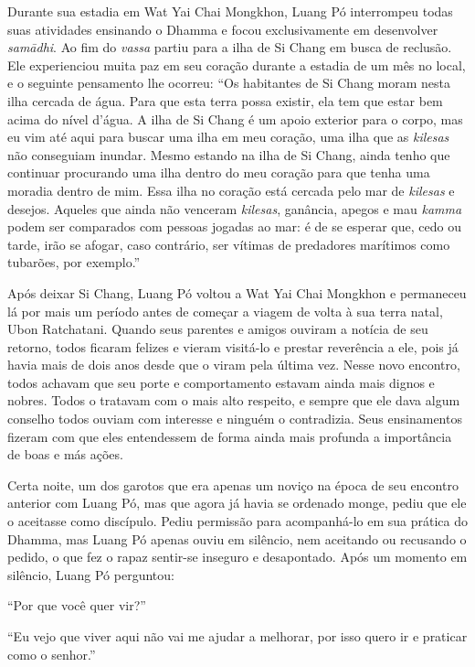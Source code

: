 Durante sua estadia em Wat Yai Chai Mongkhon, Luang Pó interrompeu todas
suas atividades ensinando o Dhamma e focou exclusivamente em desenvolver
\emph{samādhi}. Ao fim do \emph{vassa} partiu para a ilha de Si Chang em
busca de reclusão. Ele experienciou muita paz em seu coração durante a
estadia de um mês no local, e o seguinte pensamento lhe ocorreu: ``Os
habitantes de Si Chang moram nesta ilha cercada de água. Para que esta
terra possa existir, ela tem que estar bem acima do nível d'água. A ilha
de Si Chang é um apoio exterior para o corpo, mas eu vim até aqui para
buscar uma ilha em meu coração, uma ilha que as \emph{kilesas} não
conseguiam inundar. Mesmo estando na ilha de Si Chang, ainda tenho que
continuar procurando uma ilha dentro do meu coração para que tenha uma
moradia dentro de mim. Essa ilha no coração está cercada pelo mar de
\emph{kilesas} e desejos. Aqueles que ainda não venceram \emph{kilesas},
ganância, apegos e mau \emph{kamma} podem ser comparados com
pessoas jogadas ao mar: é de se esperar que, cedo ou tarde, irão se
afogar, caso contrário, ser vítimas de predadores marítimos como
tubarões, por exemplo.''

Após deixar Si Chang, Luang Pó voltou a Wat Yai Chai Mongkhon e
permaneceu lá por mais um período antes de começar a viagem de volta à
sua terra natal, Ubon Ratchatani. Quando seus parentes e amigos ouviram
a notícia de seu retorno, todos ficaram felizes e vieram visitá-lo e
prestar reverência a ele, pois já havia mais de dois anos desde que o
viram pela última vez. Nesse novo encontro, todos achavam que seu porte
e comportamento estavam ainda mais dignos e nobres. Todos o tratavam com
o mais alto respeito, e sempre que ele dava algum conselho todos ouviam
com interesse e ninguém o contradizia. Seus ensinamentos fizeram com que
eles entendessem de forma ainda mais profunda a importância de boas e
más ações.

Certa noite, um dos garotos que era apenas um noviço na época de seu
encontro anterior com Luang Pó, mas que agora já havia se ordenado
monge, pediu que ele o aceitasse como discípulo. Pediu permissão para
acompanhá-lo em sua prática do Dhamma, mas Luang Pó apenas ouviu em
silêncio, nem aceitando ou recusando o pedido, o que fez o rapaz
sentir-se inseguro e desapontado. Após um momento em silêncio, Luang Pó
perguntou:

``Por que você quer vir?''

``Eu vejo que viver aqui não vai me ajudar a melhorar, por isso quero ir
e praticar como o senhor.''

